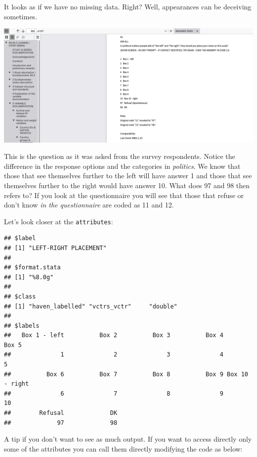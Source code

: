 \documentclass[
]{book}
\newenvironment{Shaded}{\begin{snugshade}}{\end{snugshade}}
\newcommand{\FunctionTok}[1]{\textcolor[rgb]{0.00,0.00,0.00}{#1}}
\newcommand{\NormalTok}[1]{#1}
\newcommand{\SpecialCharTok}[1]{\textcolor[rgb]{0.00,0.00,0.00}{#1}}
\begin{document}
It looks as if we have no missing data. Right? Well, appearances can be deceiving sometimes.

\includegraphics{imgs/leftright.PNG}

This is the question as it was asked from the survey respondents. Notice the difference in the response options and the categories in \emph{politics}. We know that those that see themselves further to the left will have answer 1 and those that see themselves further to the right would have answer 10. What does 97 and 98 then refers to? If you look at the questionnaire you will see that those that refuse or don't know \emph{in the questionnaire} are coded as 11 and 12.

Let's look closer at the \texttt{attributes}:

\begin{Shaded}
\end{Shaded}

\begin{verbatim}
## $label
## [1] "LEFT-RIGHT PLACEMENT"
## 
## $format.stata
## [1] "%8.0g"
## 
## $class
## [1] "haven_labelled" "vctrs_vctr"     "double"        
## 
## $labels
##   Box 1 - left          Box 2          Box 3          Box 4          Box 5 
##              1              2              3              4              5 
##          Box 6          Box 7          Box 8          Box 9 Box 10 - right 
##              6              7              8              9             10 
##        Refusal             DK 
##             97             98
\end{verbatim}

A tip if you don't want to see as much output. If you want to access directly only some of the attributes you can call them directly modifying the code as below:
\end{document}
